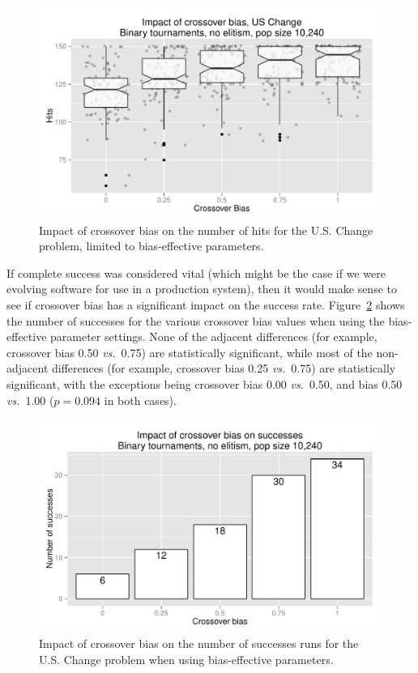 \documentclass{sig-alternate}
\begin{document}
\begin{figure}[tb]
\centering
\includegraphics[width=0.45 \textwidth]{Plots/US_change_hits_strong.pdf}
\caption{Impact of crossover bias on the number of hits for the U.S. Change problem, limited to bias-effective
parameters.}
\label{fig:USChange_Hits_strong}
\end{figure}

%
%
%
%

If complete success was considered vital (which might be the case if we were evolving software for use in a production
system), then it would make sense to see if crossover bias has a significant impact on the success rate.
Figure~\ref{fig:USChange_Successes_strong} shows the number of successes for the various crossover bias values when
using the bias-effective parameter settings. None of the adjacent differences (for example, crossover bias 0.50
\emph{vs.}\ 0.75) are statistically significant, while most of the non-adjacent differences (for example, crossover bias
0.25 \emph{vs.}\ 0.75) are statistically significant, with the exceptions being crossover bias 0.00 \emph{vs.}\ 0.50, and
bias 0.50 \emph{vs.}\ 1.00 ($p=0.094$ in both cases).

\begin{figure}
\centering
\includegraphics[width=0.45 \textwidth]{Plots/US_change_successes_strong.pdf}
\caption{Impact of crossover bias on the number of successes runs for the U.S. Change problem when using
bias-effective parameters.}
\label{fig:USChange_Successes_strong}
\end{figure}
\end{document}
